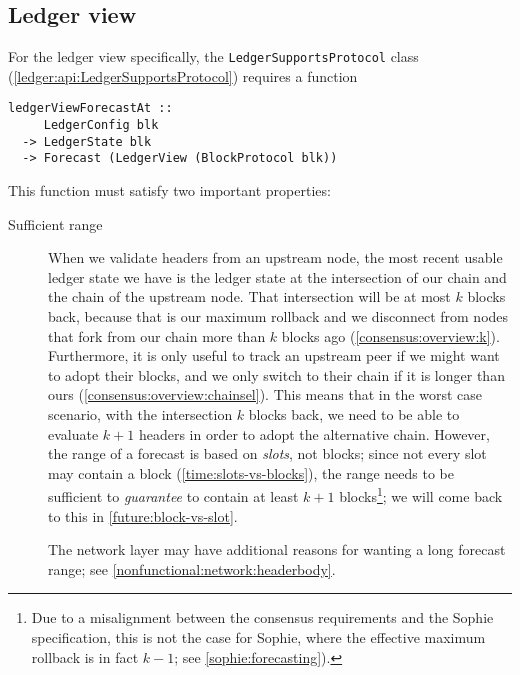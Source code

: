 \subsection{Ledger view}
\label{forecast:ledgerview}

For the ledger view specifically, the \lstinline!LedgerSupportsProtocol!
class (\cref{ledger:api:LedgerSupportsProtocol}) requires a function
%
\begin{lstlisting}
ledgerViewForecastAt ::
     LedgerConfig blk
  -> LedgerState blk
  -> Forecast (LedgerView (BlockProtocol blk))
\end{lstlisting}
%
This function must satisfy two important properties:
%
\begin{description}
\item[Sufficient range]

When we validate headers from an upstream node, the most recent usable ledger
state we have is the ledger state at the intersection of our chain and the chain
of the upstream node. That intersection will be at most $k$ blocks back, because
that is our maximum rollback and we disconnect from nodes that fork from our
chain more than $k$ blocks ago (\cref{consensus:overview:k}). Furthermore, it is
only useful to track an upstream peer if we might want to adopt their blocks,
and we only switch to their chain if it is longer than ours
(\cref{consensus:overview:chainsel}). This means that in the worst case
scenario, with the intersection $k$ blocks back, we need to be able to evaluate
$k + 1$ headers in order to adopt the alternative chain. However, the range of a
forecast is based on \emph{slots}, not blocks; since not every slot may contain
a block (\cref{time:slots-vs-blocks}), the range needs to be sufficient to
\emph{guarantee} to contain at least $k + 1$ blocks\footnote{Due to a
misalignment between the consensus requirements and the Sophie specification,
this is not the case for Sophie, where the effective maximum rollback is in
fact $k - 1$; see \cref{sophie:forecasting}).}; we will come back to this in
\cref{future:block-vs-slot}.

The network layer may have additional reasons for wanting a long forecast
range; see \cref{nonfunctional:network:headerbody}.


\end{description}
